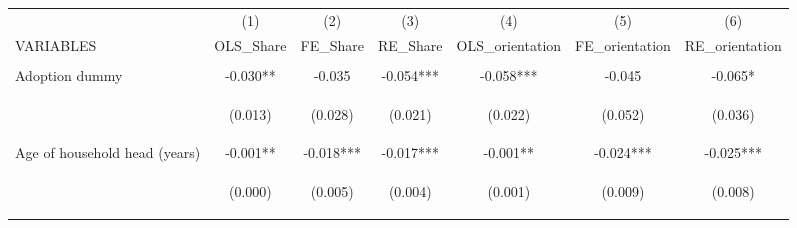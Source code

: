 \begin{center}
\begin{tabular}{lcccccc} \hline
 & (1) & (2) & (3) & (4) & (5) & (6) \\
VARIABLES & OLS\_Share & FE\_Share & RE\_Share & OLS\_orientation & FE\_orientation & RE\_orientation \\ \hline
\vspace{4pt} & \begin{footnotesize}\end{footnotesize} & \begin{footnotesize}\end{footnotesize} & \begin{footnotesize}\end{footnotesize} & \begin{footnotesize}\end{footnotesize} & \begin{footnotesize}\end{footnotesize} & \begin{footnotesize}\end{footnotesize} \\
Adoption dummy & -0.030** & -0.035 & -0.054*** & -0.058*** & -0.045 & -0.065* \\
\vspace{4pt} & \begin{footnotesize}(0.013)\end{footnotesize} & \begin{footnotesize}(0.028)\end{footnotesize} & \begin{footnotesize}(0.021)\end{footnotesize} & \begin{footnotesize}(0.022)\end{footnotesize} & \begin{footnotesize}(0.052)\end{footnotesize} & \begin{footnotesize}(0.036)\end{footnotesize} \\
Age of household head (years) & -0.001** & -0.018*** & -0.017*** & -0.001** & -0.024*** & -0.025*** \\
\vspace{4pt} & \begin{footnotesize}(0.000)\end{footnotesize} & \begin{footnotesize}(0.005)\end{footnotesize} & \begin{footnotesize}(0.004)\end{footnotesize} & \begin{footnotesize}(0.001)\end{footnotesize} & \begin{footnotesize}(0.009)\end{footnotesize} & \begin{footnotesize}(0.008)\end{footnotesize} \\

\end{tabular}
\end{center}
